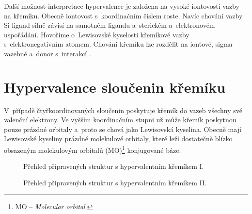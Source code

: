 \documentclass[
digital, %
table,   %
nolof,     %
nolot,     %
oneside,
]{fithesis3}
\renewcommand{\thesubfigure}{}
\begin{document}
Další možnost interpretace hypervalence je založena na vysoké iontovosti vazby na křemíku. Obecně iontovost s~koordinačním číslem roste.
Navíc chování vazby Si-ligand silně závisí na samotném ligandu a~sterickém a~elektronovém uspořádání. Hovoříme o~Lewisovské kyselosti křemíkové vazby s~elektronegativním atomem. Chování křemíku lze rozdělit na iontové, sigma vazebné a~donor s~interakcí \cite{Wagler2014}.\\

\section{Hypervalence sloučenin křemíku}\label{teorie_hypervalence}
V~případě čtyřkoordinovaných sloučenin poskytuje křemík do vazeb všechny své valenční elektrony. Ve vyšším koordinačním stupni už může křemík poskytnou pouze prázdné orbitaly a~proto se chová jako Lewisovská kyselina. Obecně mají Lewisovské kyseliny prázdné molekulové orbitaly, které leží dostatečně blízko obsazeným molekulovým orbitalů (MO)\footnote{MO -- \textit{Molecular orbital}.} konjugované báze.
\renewcommand{\thesubfigure}{(\alph{subfigure})}
\begin{figure}
\begin{center}
\label{shrnuti_struktury_kremikI}
\caption{Přehled připravených struktur s hypervalentním křemíkem I.}
\end{center}
\end{figure}

\begin{figure}
\begin{center}
\label{shrnuti_struktury_kremikII}
\caption{Přehled připravených struktur s hypervalentním křemíkem II.}
\end{center}
\end{figure}
\renewcommand{\thesubfigure}{}
\end{document}
